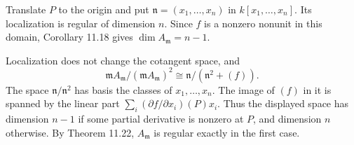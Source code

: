 Translate $P$ to the origin and put $\mathfrak n=(x_1,\ldots,x_n)$ in $k[x_1,\ldots,x_n]$. Its localization is regular of dimension $n$. Since $f$ is a nonzero nonunit in this domain, Corollary 11.18 gives $\dim A_{\mathfrak m}=n-1$.

Localization does not change the cotangent space, and
\[\mathfrak mA_{\mathfrak m}/(\mathfrak mA_{\mathfrak m})^2\cong\mathfrak n/(\mathfrak n^2+(f)).\]
The space $\mathfrak n/\mathfrak n^2$ has basis the classes of $x_1,\ldots,x_n$. The image of $(f)$ in it is spanned by the linear part $\sum_i(\partial f/\partial x_i)(P)x_i$. Thus the displayed space has dimension $n-1$ if some partial derivative is nonzero at $P$, and dimension $n$ otherwise. By Theorem 11.22, $A_{\mathfrak m}$ is regular exactly in the first case.

